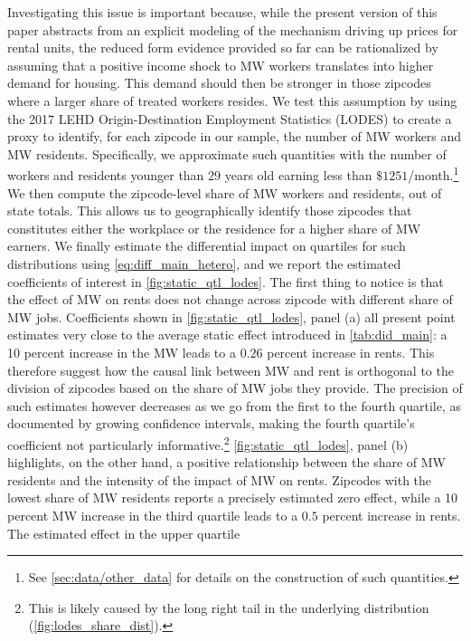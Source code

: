 Investigating this issue is important because, while the present version of this paper abstracts from an explicit modeling 
of the mechanism driving up prices for rental units, the reduced form evidence provided so far can be rationalized by 
assuming that a positive income shock to MW workers translates into higher demand for housing. This demand 
should then be stronger in those zipcodes where a larger share of treated workers resides. We test this assumption by 
using the 2017 LEHD Origin-Destination Employment Statistics (LODES) to create a proxy to identify, for each 
zipcode in our sample, the number of MW workers and MW residents. Specifically, we approximate such quantities
with the number of workers and residents younger than $29$ years old earning less than $\$1251$/month.\footnote{See
\autoref{sec:data/other_data} for details on the construction of such quantities.}
We then compute the zipcode-level share of MW workers and residents, out of state totals. This allows us to 
geographically identify those zipcodes that constitutes either the workplace or the residence for a higher share
of MW earners. We finally estimate the differential impact on quartiles for such distributions 
using \autoref{eq:diff_main_hetero}, and we report the estimated coefficients of interest in \autoref{fig:static_qtl_lodes}.
The first thing to notice is that the effect of MW on rents does not change across zipcode with different
share of MW jobs. Coefficients shown in  \autoref{fig:static_qtl_lodes}, panel (a) all present point estimates
very close to the average static effect introduced in \autoref{tab:did_main}: a 10 percent increase in the MW leads
to a $0.26$ percent increase in rents. This therefore suggest how the causal link between MW and rent is orthogonal 
to the division of zipcodes based on the share of MW jobs they provide. The precision of such estimates however 
decreases as we go from the first to the fourth quartile, as documented by growing confidence intervals, making the 
fourth quartile's coefficient not particularly informative.\footnote{\label{ft:long_tail}This 
	is likely caused by the long right tail in the underlying distribution (\autoref{fig:lodes_share_dist}).}  
\autoref{fig:static_qtl_lodes}, panel (b) highlights, on the other hand, a positive relationship between the share of 
MW residents and the intensity of the impact of MW on rents.  Zipcodes with the lowest share of MW residents
reports a precisely estimated zero effect, while a 10 percent MW increase in the 
third quartile leads to a $0.5$ percent increase in rents. The estimated effect in the upper quartile 
